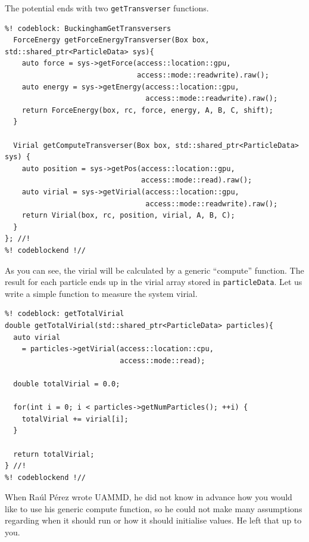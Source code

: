 The potential ends with two \texttt{getTransverser} functions.
\begin{lstlisting}
%! codeblock: BuckinghamGetTransversers
  ForceEnergy getForceEnergyTransverser(Box box, std::shared_ptr<ParticleData> sys){
    auto force = sys->getForce(access::location::gpu,
                               access::mode::readwrite).raw();
    auto energy = sys->getEnergy(access::location::gpu,
                                 access::mode::readwrite).raw();
    return ForceEnergy(box, rc, force, energy, A, B, C, shift);
  }

  Virial getComputeTransverser(Box box, std::shared_ptr<ParticleData> sys) {
    auto position = sys->getPos(access::location::gpu,
                                access::mode::read).raw();
    auto virial = sys->getVirial(access::location::gpu,
                                 access::mode::readwrite).raw();
    return Virial(box, rc, position, virial, A, B, C);
  }
}; //!
%! codeblockend !//
\end{lstlisting}
As you can see, the virial will be calculated by a generic ``compute'' function. 
The result for each particle ends up in the virial array stored in 
\texttt{particleData}. Let us write a simple function to measure the system 
virial.
\begin{lstlisting}
%! codeblock: getTotalVirial
double getTotalVirial(std::shared_ptr<ParticleData> particles){
  auto virial
    = particles->getVirial(access::location::cpu,
                           access::mode::read);

  double totalVirial = 0.0;

  for(int i = 0; i < particles->getNumParticles(); ++i) {
    totalVirial += virial[i];
  }

  return totalVirial;
} //!
%! codeblockend !//
\end{lstlisting}

When Ra\'ul P\'erez wrote UAMMD, he did not know in advance how you would like 
to use his generic compute function, so he could not make many assumptions 
regarding when it should run or how it should initialise values. He left that up 
to you.

